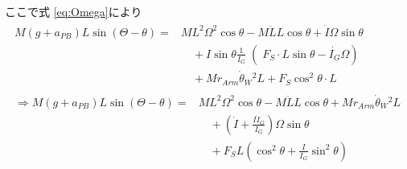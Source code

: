 \documentclass[a4paper,11pt]{jsarticle}
\begin{document}
ここで式 \ref{eq:Omega}により
\begin{align}
  \begin{aligned}
    M(g+a_{PB}) L\sin(\Theta - \theta)
    =&
    ML^2\Omega^2 \cos\theta - M\ddot{L}L \cos\theta
    + \dot{I}\Omega \sin\theta 
    \\
    &\quad + I\sin\theta
    \left.\frac{1}{I_G}\middle(
      F_S \cdot L\sin\theta
      -\dot{I_G}\Omega
    \right)
    \\
    &\quad + Mr_{Arm}\dot{\theta}_W{}^2L + F_S\cos^2\theta \cdot L
  \end{aligned}
  \\
  \begin{aligned}
    \Rightarrow
    M(g+a_{PB}) L\sin(\Theta - \theta)
    =&
    ML^2\Omega^2 \cos\theta - M\ddot{L}L \cos\theta
    + Mr_{Arm}\dot{\theta}_W{}^2L 
    \\
    &\quad
    + \left(
      \dot{I} + \frac{I\dot{I}_G}{I_G}
    \right)
    \Omega\sin\theta
    \\
    &\quad
    + F_S L\left(
      \cos^2\theta + \frac{I}{I_G}\sin^2\theta
    \right)
  \end{aligned}
\end{align}
\end{document}
